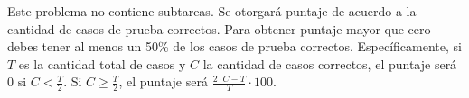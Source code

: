 \documentclass{oci}
\begin{document}
\begin{scoreDescription}
  Este problema no contiene subtareas.
  Se otorgará puntaje de acuerdo a la cantidad de casos de prueba correctos.
  Para obtener puntaje mayor que cero debes tener al menos un 50\% de los casos de
  prueba correctos.
  Específicamente, si $T$ es la cantidad total de casos y $C$ la cantidad de casos correctos,
  el puntaje será 0 si $C < \frac{T}{2}$.
  Si $C \geq \frac{T}{2}$, el puntaje será $\frac{2\cdot C - T}{T}\cdot 100$.
\end{scoreDescription}

\begin{sampleDescription}
\end{sampleDescription}
\end{document}
